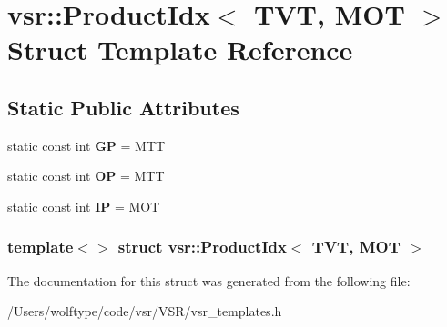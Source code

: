 \hypertarget{structvsr_1_1_product_idx_3_01_t_v_t_00_01_m_o_t_01_4}{\section{vsr\-:\-:Product\-Idx$<$ T\-V\-T, M\-O\-T $>$ Struct Template Reference}
\label{structvsr_1_1_product_idx_3_01_t_v_t_00_01_m_o_t_01_4}
}
\subsection*{Static Public Attributes}
\begin{DoxyCompactItemize}
\item 
\hypertarget{structvsr_1_1_product_idx_3_01_t_v_t_00_01_m_o_t_01_4_a9bc7b995c589993ee2c8607dd4b2534f}{static const int {\bfseries G\-P} = M\-T\-T}\label{structvsr_1_1_product_idx_3_01_t_v_t_00_01_m_o_t_01_4_a9bc7b995c589993ee2c8607dd4b2534f}

\item 
\hypertarget{structvsr_1_1_product_idx_3_01_t_v_t_00_01_m_o_t_01_4_a711c9cd5474298a87f41e97356dd32be}{static const int {\bfseries O\-P} = M\-T\-T}\label{structvsr_1_1_product_idx_3_01_t_v_t_00_01_m_o_t_01_4_a711c9cd5474298a87f41e97356dd32be}

\item 
\hypertarget{structvsr_1_1_product_idx_3_01_t_v_t_00_01_m_o_t_01_4_a08b9094f8523208829a0ea89f9609d90}{static const int {\bfseries I\-P} = M\-O\-T}\label{structvsr_1_1_product_idx_3_01_t_v_t_00_01_m_o_t_01_4_a08b9094f8523208829a0ea89f9609d90}

\end{DoxyCompactItemize}
\subsubsection*{template$<$$>$ struct vsr\-::\-Product\-Idx$<$ T\-V\-T, M\-O\-T $>$}



The documentation for this struct was generated from the following file\-:\begin{DoxyCompactItemize}
\item 
/\-Users/wolftype/code/vsr/\-V\-S\-R/vsr\-\_\-templates.\-h\end{DoxyCompactItemize}
